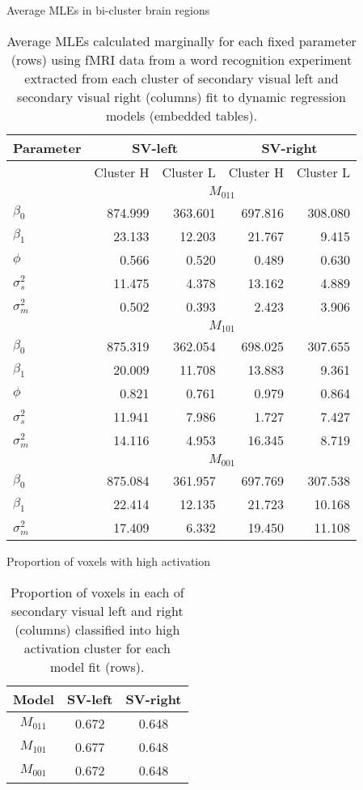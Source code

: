 \begin{table}
\ssp
\centering
\caption{Average MLEs in bi-cluster brain regions} \label{tab:fmri:mle:clusters}
\begin{tabular}{|l|rr|rr|}
\hline
Parameter & \multicolumn{2}{|c|}{SV-left} & \multicolumn{2}{|c|}{SV-right} \\
\hline
 & Cluster H & Cluster L & Cluster H & Cluster L \\
\hline
 & \multicolumn{4}{|c|}{$M_{011}$} \\
\hline
$\beta_0$ & 874.999 & 363.601 & 697.816 & 308.080 \\
$\beta_1$ & 23.133 & 12.203 & 21.767 & 9.415 \\
$\phi$ & 0.566 & 0.520 & 0.489 & 0.630 \\
$\sigma^2_s$ & 11.475 & 4.378 & 13.162 & 4.889 \\
$\sigma^2_m$ & 0.502 & 0.393 & 2.423 & 3.906 \\
\hline
 & \multicolumn{4}{|c|}{$M_{101}$} \\
\hline
$\beta_0$ & 875.319 & 362.054 & 698.025 & 307.655 \\
$\beta_1$ & 20.009 & 11.708 & 13.883 & 9.361 \\
$\phi$ & 0.821 & 0.761 & 0.979 & 0.864 \\
$\sigma^2_s$ & 11.941 & 7.986 & 1.727 & 7.427 \\
$\sigma^2_m$ & 14.116 & 4.953 & 16.345 & 8.719 \\
\hline
 & \multicolumn{4}{|c|}{$M_{001}$} \\
\hline
$\beta_0$ & 875.084 & 361.957 & 697.769 & 307.538 \\
$\beta_1$ & 22.414 & 12.135 & 21.723 & 10.168 \\
$\sigma^2_m$ & 17.409 & 6.332 & 19.450 & 11.108 \\
\hline
\end{tabular}
\caption*{Average MLEs calculated marginally for each fixed parameter (rows) using fMRI data from a word recognition experiment extracted from each cluster of secondary visual left and secondary visual right (columns) fit to dynamic regression models (embedded tables).}
\end{table}

\begin{table}
\ssp
\centering
\caption{Proportion of voxels with high activation} \label{tab:fmri:prop}
\begin{tabular}{|c|cc|}
\hline
Model & SV-left & SV-right \\
\hline
$M_{011}$ & 0.672 & 0.648 \\
$M_{101}$ & 0.677 & 0.648 \\
$M_{001}$ & 0.672 & 0.648 \\
\hline
\end{tabular}
\caption*{Proportion of voxels in each of secondary visual left and right (columns) classified into high activation cluster for each model fit (rows).}
\end{table}


